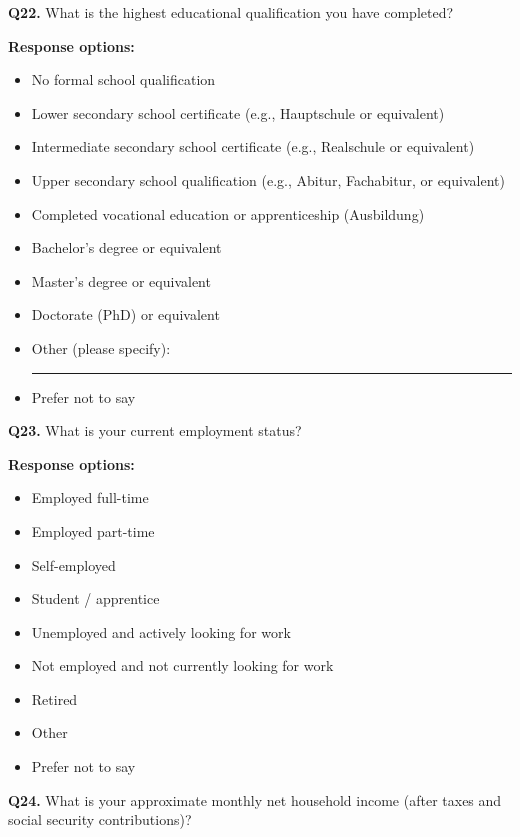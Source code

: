 \medskip

\noindent\textbf{Q22.}
What is the highest educational qualification you have completed?

\smallskip

\noindent\textbf{Response options:}
\begin{itemize}
    \item No formal school qualification
    \item Lower secondary school certificate (e.g., Hauptschule or equivalent)
    \item Intermediate secondary school certificate (e.g., Realschule or equivalent)
    \item Upper secondary school qualification (e.g., Abitur, Fachabitur, or equivalent)
    \item Completed vocational education or apprenticeship (Ausbildung)
    \item Bachelor's degree or equivalent
    \item Master's degree or equivalent
    \item Doctorate (PhD) or equivalent
    \item Other (please specify): \rule{3cm}{0.4pt}
    \item Prefer not to say
\end{itemize}

\medskip

\noindent\textbf{Q23.}
What is your current employment status?

\smallskip

\noindent\textbf{Response options:}
\begin{itemize}
    \item Employed full-time
    \item Employed part-time
    \item Self-employed
    \item Student / apprentice
    \item Unemployed and actively looking for work
    \item Not employed and not currently looking for work
    \item Retired
    \item Other
    \item Prefer not to say
\end{itemize}

\medskip

\noindent\textbf{Q24.}
What is your approximate monthly net household income (after taxes and social
security contributions)?


